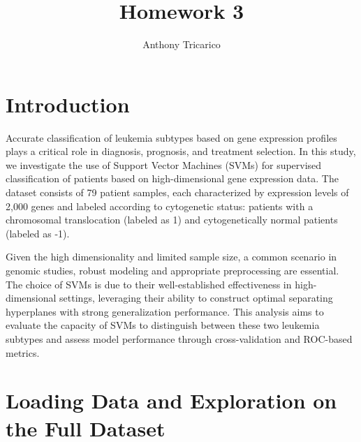 \documentclass[11pt]{article}
\title{Homework 3}
\author{Anthony Tricarico}
\begin{document}
    
    \maketitle
    
    

    
    \section{Introduction}\label{introduction}

Accurate classification of leukemia subtypes based on gene expression
profiles plays a critical role in diagnosis, prognosis, and treatment
selection. In this study, we investigate the use of Support Vector
Machines (SVMs) for supervised classification of patients based on
high-dimensional gene expression data. The dataset consists of 79
patient samples, each characterized by expression levels of 2,000 genes
and labeled according to cytogenetic status: patients with a chromosomal
translocation (labeled as 1) and cytogenetically normal patients
(labeled as -1).

Given the high dimensionality and limited sample size, a common scenario
in genomic studies, robust modeling and appropriate preprocessing are
essential. The choice of SVMs is due to their well-established
effectiveness in high-dimensional settings, leveraging their ability to
construct optimal separating hyperplanes with strong generalization
performance. This analysis aims to evaluate the capacity of SVMs to
distinguish between these two leukemia subtypes and assess model
performance through cross-validation and ROC-based metrics.

    \section{Loading Data and Exploration on the Full
Dataset}\label{loading-data-and-exploration-on-the-full-dataset}
\end{document}
